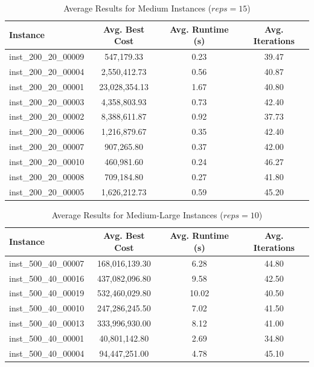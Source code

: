 \documentclass{article}
\begin{document}
\begin{table}[H]
\centering
\caption{Average Results for Medium Instances ($reps=15$)}
\begin{tabular}{lccc}
\toprule
\textbf{Instance} & \textbf{Avg. Best Cost} & \textbf{Avg. Runtime (s)} & \textbf{Avg. Iterations} \\
\midrule
inst\_200\_20\_00009 & 547,179.33  & 0.23 & 39.47 \\
inst\_200\_20\_00004 & 2,550,412.73 & 0.56 & 40.87 \\
inst\_200\_20\_00001 & 23,028,354.13 & 1.67 & 40.80 \\
inst\_200\_20\_00003 & 4,358,803.93 & 0.73 & 42.40 \\
inst\_200\_20\_00002 & 8,388,611.87 & 0.92 & 37.73 \\
inst\_200\_20\_00006 & 1,216,879.67 & 0.35 & 42.40 \\
inst\_200\_20\_00007 & 907,265.80  & 0.37 & 42.00 \\
inst\_200\_20\_00010 & 460,981.60  & 0.24 & 46.27 \\
inst\_200\_20\_00008 & 709,184.80  & 0.27 & 41.80 \\
inst\_200\_20\_00005 & 1,626,212.73 & 0.59 & 45.20 \\
\bottomrule
\end{tabular}
\label{tab:avg_results_200_20}
\end{table}

\begin{table}[H]
\centering
\caption{Average Results for Medium-Large Instances ($reps=10$)}
\begin{tabular}{lccc}
\toprule
\textbf{Instance} & \textbf{Avg. Best Cost} & \textbf{Avg. Runtime (s)} & \textbf{Avg. Iterations} \\
\midrule
inst\_500\_40\_00007 & 168,016,139.30 & 6.28  & 44.80 \\
inst\_500\_40\_00016 & 437,082,096.80 & 9.58  & 42.50 \\
inst\_500\_40\_00019 & 532,460,029.80 & 10.02 & 40.50 \\
inst\_500\_40\_00010 & 247,286,245.50 & 7.02  & 41.50 \\
inst\_500\_40\_00013 & 333,996,930.00 & 8.12  & 41.00 \\
inst\_500\_40\_00001 & 40,801,142.80  & 2.69  & 34.80 \\
inst\_500\_40\_00004 & 94,447,251.00  & 4.78  & 45.10 \\
\bottomrule
\end{tabular}
\label{tab:avg_results_500_40}
\end{table}
\end{document}
